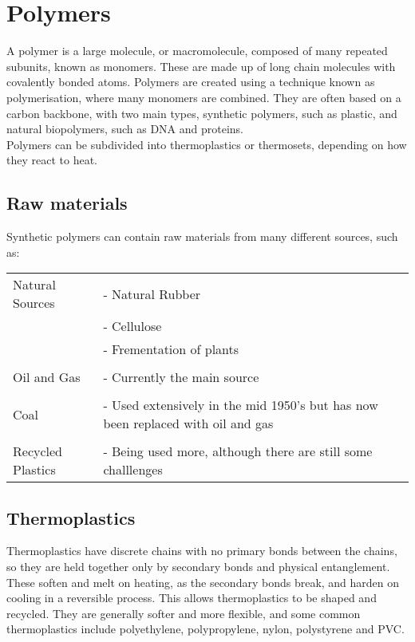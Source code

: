 \documentclass[a4paper, 12pt]{article}
\begin{document}
\newpage

\section{Polymers}
	A polymer is a large molecule, or macromolecule, composed of many repeated subunits, known as monomers. These are made up of long chain molecules with covalently bonded atoms. Polymers are created using a technique known as polymerisation, where many monomers are combined. They are often based on a carbon backbone, with two main types, synthetic polymers, such as plastic, and natural biopolymers, such as DNA and proteins. \\
	Polymers can be subdivided into thermoplastics or thermosets, depending on how they react to heat.	
	\subsection{Raw materials}
		Synthetic polymers can contain raw materials from many different sources, such as: \\
		\par
		
		\begin{tabularx}{\textwidth}{l X}
			Natural Sources & - Natural Rubber \\
			& - Cellulose \\
			& - Frementation of plants \\
			& \\
			Oil and Gas & - Currently the main source \\
			& \\
			Coal & - Used extensively in the mid 1950's but has now been replaced with oil and gas \\
			& \\
			Recycled Plastics & - Being used more, although there are still some challlenges \\
		\end{tabularx}
		
	\subsection{Thermoplastics}
		Thermoplastics have discrete chains with no primary bonds between the chains, so they are held together only by secondary bonds and physical entanglement. These soften and melt on heating, as the secondary bonds break, and harden on cooling in a reversible process. This allows thermoplastics to be shaped and recycled. They are generally softer and more flexible, and some common thermoplastics include polyethylene, polypropylene, nylon, polystyrene and PVC.
		
\end{document}
